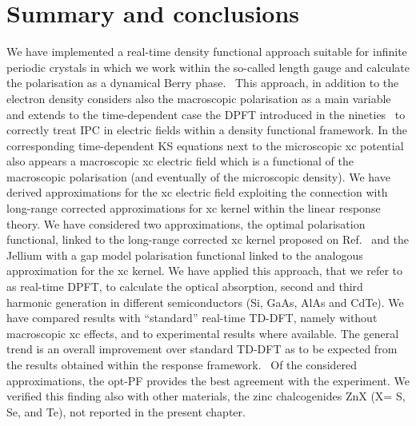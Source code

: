 \section{Summary and conclusions}
We have implemented a real-time density functional approach suitable for infinite periodic crystals in which we work within the so-called length gauge and calculate the polarisation as a dynamical Berry phase.~\cite{souza_prb}        
This approach, in addition to the electron density considers also the macroscopic polarisation as a main variable and extends to the time-dependent case the DPFT introduced in the nineties~\cite{Gonze1995,Resta1996,Vanderbilt1997,Martin1997} to correctly treat IPC in electric fields within a density functional framework. In the corresponding time-dependent KS equations next to the microscopic xc potential also appears a macroscopic xc electric field which is a functional of the macroscopic polarisation (and eventually of the microscopic density).
We have derived approximations for the xc electric field exploiting the connection with long-range corrected approximations for xc kernel within the linear response theory. We have considered two approximations, the optimal polarisation functional, linked to the  long-range corrected xc kernel proposed on Ref.~\cite{LRC} and the Jellium with a gap model polarisation functional linked to the analogous approximation for the xc kernel.\cite{jgm}
We have applied this approach, that we refer to as real-time DPFT, to calculate the optical absorption, second and third harmonic generation in different semiconductors (Si, GaAs, AlAs and CdTe). We have compared results with ``standard'' real-time TD-DFT, namely without macroscopic xc effects, and to experimental results where available. The general trend is an overall improvement over standard TD-DFT as to be expected from the results obtained within the response framework.~\cite{LRC} Of the considered approximations, the opt-PF provides the best agreement with the experiment.
We verified this finding also with other materials, the zinc chalcogenides ZnX (X= S, Se, and Te)\cite{gruningtddf2}, not reported in the present chapter.

